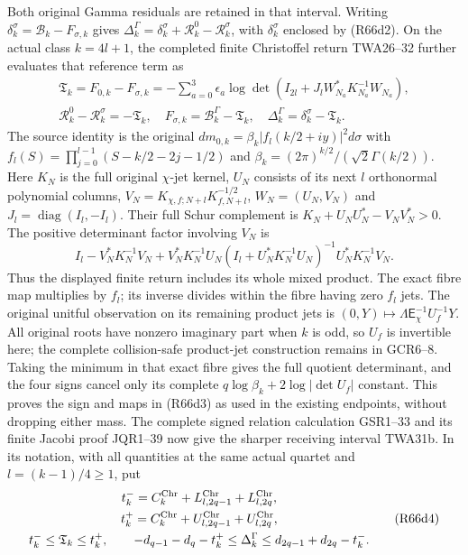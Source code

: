 Both original Gamma residuals are retained in that interval.
Writing
$\delta_k^\sigma=\mathcal B_k-F_{\sigma,k}$ gives
$\Delta_k^\Gamma=\delta_k^\sigma+
\mathcal R_k^0-\mathcal R_k^\sigma$, with
$\delta_k^\sigma$ enclosed by (R66d2).
On the actual class $k=4l+1$, the completed finite
Christoffel return TWA26--32 further evaluates that
reference term as
\[
\begin{gathered}
 \mathfrak T_k=F_{0,k}-F_{\sigma,k}
    =-\sum_{a=0}^3\epsilon_a
       \log\det(I_{2l}+J_lW_{N_a}^*K_{N_a}^{-1}W_{N_a}),\\
 \mathcal R_k^0-\mathcal R_k^\sigma=-\mathfrak T_k,\quad
 F_{\sigma,k}=\mathcal B_k^\Gamma-\mathfrak T_k,\quad
 \Delta_k^\Gamma=\delta_k^\sigma-\mathfrak T_k .
\end{gathered}\tag{R66d3}
\]
The source identity is the original
$dm_{0,k}=\beta_k|f_l(k/2+iy)|^2d\sigma$ with
$f_l(S)=\prod_{j=0}^{l-1}(S-k/2-2j-1/2)$ and
$\beta_k=(2\pi)^{k/2}/(\sqrt2\Gamma(k/2))$.
Here $K_N$ is the full original $\chi$-jet kernel,
$U_N$ consists of its next $l$ orthonormal polynomial
columns,
$V_N=K_{\chi,f;N+l}K_{f,N+l}^{-1/2}$,
$W_N=(U_N,V_N)$ and $J_l=\operatorname{diag}(I_l,-I_l)$.
Their full Schur complement is
$K_N+U_NU_N^*-V_NV_N^*>0$.
The positive determinant factor involving $V_N$ is
\[
 I_l-V_N^*K_N^{-1}V_N+
 V_N^*K_N^{-1}U_N(I_l+U_N^*K_N^{-1}U_N)^{-1}
                         U_N^*K_N^{-1}V_N .
\]
Thus the displayed finite return includes its whole
mixed product. The exact fibre map multiplies by $f_l$;
its inverse divides within the fibre having zero $f_l$
jets. The original unitful observation on its remaining
product jets is
$(0,Y)\mapsto\Lambda\mathsf E_\chi^{-1}U_f^{-1}Y$.
All original roots have nonzero imaginary part when
$k$ is odd, so $U_f$ is invertible here; the complete
collision-safe product-jet construction remains in GCR6--8.
Taking the minimum in that exact fibre gives the full
quotient determinant, and the four signs cancel only
its complete $q\log\beta_k+2\log|\det U_f|$ constant.
This proves the sign and maps in (R66d3) as used in
the existing endpoints, without dropping either mass.
The complete signed relation calculation GSR1--33 and its
finite Jacobi proof JQR1--39 now give the sharper receiving
interval TWA31b. In its notation, with all quantities at
the same actual quartet and $l=(k-1)/4\geq1$, put
\[
\begin{gathered}
 t_k^-=C_k^{\rm Chr}+L_{l,2q-1}^{\rm Chr}+L_{l,2q}^{\rm Chr},\\
 t_k^+=C_k^{\rm Chr}+U_{l,2q-1}^{\rm Chr}+U_{l,2q}^{\rm Chr},\\
 t_k^-\leq\mathfrak T_k\leq t_k^+,\qquad
 -d_{q-1}-d_q-t_k^+\leq\Delta_k^\Gamma
                 \leq d_{2q-1}+d_{2q}-t_k^-.
\end{gathered}\tag{R66d4}
\]

